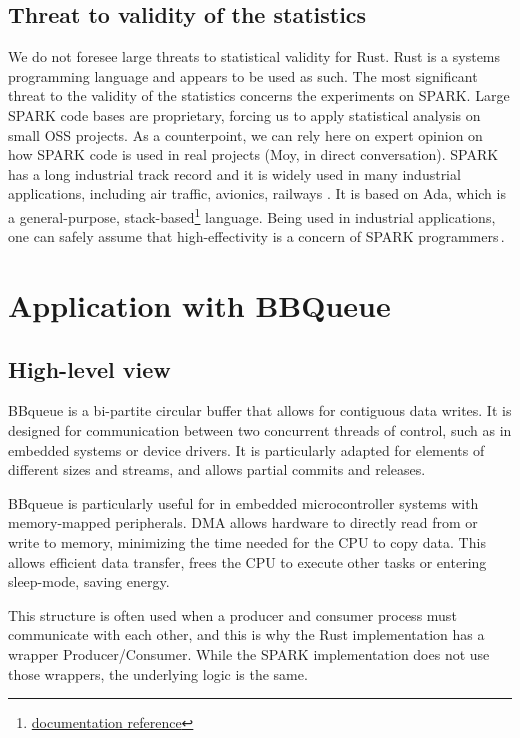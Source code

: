 \documentclass[nomenclature, english, bibtex]{kththesis}
\begin{document}
\subsection{Threat to validity of the statistics}

We do not foresee large threats to statistical validity for Rust. Rust is a systems programming language and appears to be used as such. The most significant threat to the validity of the statistics concerns the experiments on SPARK. Large SPARK code bases are proprietary, forcing us to apply statistical analysis on small \gls{OSS} projects. As a counterpoint, we can rely here on expert opinion on how SPARK code is used in real projects (Moy, in direct conversation). SPARK has a long industrial track record and it is widely used in many industrial applications, including air traffic, avionics, railways \etc. It is based on Ada, which is a general-purpose, stack-based\footnote{\href{https://www.adacore.com/uploads/books/pdf/AdaCore-Tech-Cyber-Security-web.pdf}{documentation reference}} language. Being used in industrial applications, one can safely assume that high-effectivity is a concern of SPARK programmers\,\cite{chapman_adacore_2018}.

\section[BBqueue]{Application with BBQueue}
\label{sec:methodBBQueue}
\subsection{High-level view}
BBqueue is a bi-partite circular buffer that allows for contiguous data writes. It is designed for communication between two concurrent threads of control, such as in embedded systems or device drivers. It is particularly adapted for elements of different sizes and streams, and allows partial commits and releases.

BBqueue is particularly useful for  in embedded microcontroller systems with memory-mapped peripherals. DMA allows hardware to directly read from or write to memory, minimizing the time needed for the CPU to copy data. This allows efficient data transfer, frees the CPU to execute other tasks or entering sleep-mode, saving energy.

This structure is often used when a producer and consumer process must communicate with each other, and this is why the Rust implementation has a wrapper Producer/Consumer. While the SPARK implementation does not use those wrappers, the underlying logic is the same.
\end{document}
